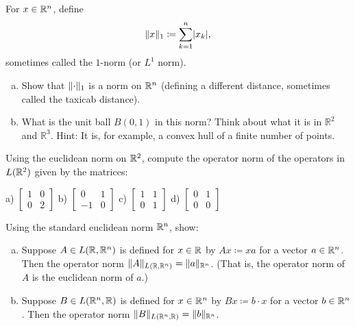 \begin{exercise}
For $x \in {\mathbb{R}}^n$, define
\begin{equation*}
\lVert {x} \rVert_{1} \coloneqq \sum_{k=1}^n \lvert {x_k} \rvert,
\end{equation*}
sometimes called the $1$-norm (or $L^1$ norm).
\begin{enumerate}[a)]
\item
Show that $\lVert {\cdot} \rVert_1$ is a norm on ${\mathbb{R}}^n$ (defining a different
distance, sometimes called the taxicab distance).
\item
What is the unit ball $B(0,1)$ in this norm?
Think about what it is in ${\mathbb{R}}^2$ and $\mathbb{R}^3$.
Hint: It is, for example, a convex hull of a finite number of points.
\end{enumerate}
\end{exercise}

\begin{exercise}
\pagebreak[3]
Using the euclidean norm on ${\mathbb{R}}^2$, compute the operator norm of the
operators in $L({\mathbb{R}}^2)$ given by the matrices:

\medskip
\noindent
a)
$\left[
\begin{smallmatrix}
1 & 0 \\
0 & 2
\end{smallmatrix}
\right]$
\quad
b)
$\left[
\begin{smallmatrix}
0 & 1 \\
-1 & 0
\end{smallmatrix}
\right]$
\quad
c)
$\left[
\begin{smallmatrix}
1 & 1 \\
0 & 1
\end{smallmatrix}
\right]$
\quad
d)
$\left[
\begin{smallmatrix}
0 & 1 \\
0 & 0
\end{smallmatrix}
\right]$
\end{exercise}


\begin{exercise} \label{exercise:normonedim}
\pagebreak[2]
Using the standard euclidean norm ${\mathbb{R}}^n$, show:
\begin{enumerate}[a)]
\item
Suppose $A \in L({\mathbb{R}},{\mathbb{R}}^n)$ is defined for $x \in {\mathbb{R}}$ by $Ax \coloneqq xa$
for a vector $a \in {\mathbb{R}}^n$.
Then the operator norm $\lVert {A} \rVert_{L({\mathbb{R}},{\mathbb{R}}^n)} = \lVert {a} \rVert_{{\mathbb{R}}^n}$.
(That is, the operator norm of $A$ is the euclidean norm of $a$.)
\item
Suppose $B \in L({\mathbb{R}}^n,{\mathbb{R}})$ is defined for $x \in {\mathbb{R}}^n$ by $Bx \coloneqq b \cdot x$
for a vector $b \in {\mathbb{R}}^n$.
Then the operator norm $\lVert {B} \rVert_{L({\mathbb{R}}^n,{\mathbb{R}})} = \lVert {b} \rVert_{{\mathbb{R}}^n}$.
\end{enumerate}
\end{exercise}

